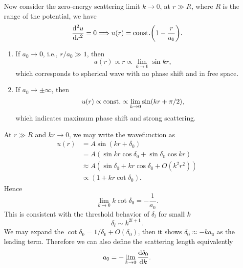 \documentclass[10pt]{article}
\begin{document}
Now consider the zero-energy scattering limit $k \to 0$, at $r \gg R$, where $R$ is the range of the potential, we have
\begin{equation}
	\dv[2]{u}{r} =0 \Longrightarrow u(r) = {\mathrm{const.}} \qty(1- \frac{r}{a_0}).
\end{equation}
\begin{enumerate}
	\item If $a_0 \to 0$, i.e., $r/a_0 \gg 1$, then
	\begin{equation}
		u(r) \propto r \propto \lim_{k\to 0} \sin{kr},
	\end{equation}
	which corresponds to spherical wave with no phase shift and in free space.
	\item If $a_0 \to \pm \infty$, then
	\begin{equation}
		u(r) \propto {\mathrm{const.}} \propto \lim_{k \to 0} \sin(kr + \pi/2),
	\end{equation}
	which indicates maximum phase shift and strong scattering.
\end{enumerate}

At $r \gg R$ and $kr \to 0$, we may write the wavefunction as
\begin{align*}
	u(r) &= A \sin(kr + \delta_0) \\
	&= A(\sin{kr} \cos{\delta_0} + \sin{\delta_0} \cos{kr}) \\
	&\approx A (\sin{\delta_0} + kr \cos{\delta_0} + O(k^2r^2)) \\
	&\propto (1+ k r \cot{\delta_0}).
\end{align*}
Hence
\begin{equation}
	\lim_{k \to 0} k \cot{\delta_0} = -\frac{1}{a_0}.
\end{equation}
This is consistent with the threshold behavior of $\delta_l$ for small $k$
\begin{equation}
	\delta_l \sim k^{2l + 1}.
\end{equation}
We may expand the $\cot{\delta_0} = 1/\delta_0 + O(\delta_0)$, then it shows $\delta_0 \approx -ka_0$ as the leading term. Therefore we can also define the scattering length equivalently
\begin{equation}
	a_0 = - \lim_{k \to 0}\dv{\delta_0}{k}.
\end{equation}
\end{document}
